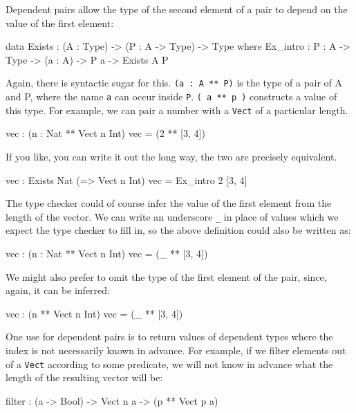 Dependent pairs allow the type of the second element of a pair to depend on the value of the first element:

\begin{code}
data Exists : (A : Type) -> (P : A -> Type) -> Type where
   Ex_intro : {P : A -> Type} -> (a : A) -> P a -> Exists A P
\end{code}

\noindent
Again, there is syntactic sugar for this. \texttt{(a : A ** P)} is the type of a pair of A and P, where the name \texttt{a} can occur inside \texttt{P}.
\texttt{( a ** p )}  constructs a value of this type. For example, we can pair a number with a  \texttt{Vect} of a particular length.

\begin{code}
vec : (n : Nat ** Vect n Int)
vec = (2 ** [3, 4])
\end{code}

\noindent
If you like, you can write it out the long way, the two are precisely equivalent.

\begin{code}
vec : Exists Nat (\n => Vect n Int)
vec = Ex_intro 2 [3, 4]
\end{code}

The type checker could of course infer the value of the first element from the
length of the vector.
We can write an underscore \texttt{\_} in place of values which we expect the type checker to fill in, so the above definition could also be written as:

\begin{code}
vec : (n : Nat ** Vect n Int)
vec = (_ ** [3, 4])
\end{code}


\noindent
We might also prefer to omit the type of the first element of the pair, since, again, it can be inferred:

\begin{code}
vec : (n ** Vect n Int)
vec = (_ ** [3, 4])
\end{code}

\noindent
One use for dependent pairs is to return values of dependent types where the index is not necessarily known in advance.
For example, if we filter elements out of a \texttt{Vect} according to some predicate, we will not know in advance what the length of the resulting vector will be:

\begin{code}
filter : (a -> Bool) -> Vect n a -> (p ** Vect p a)
\end{code}


